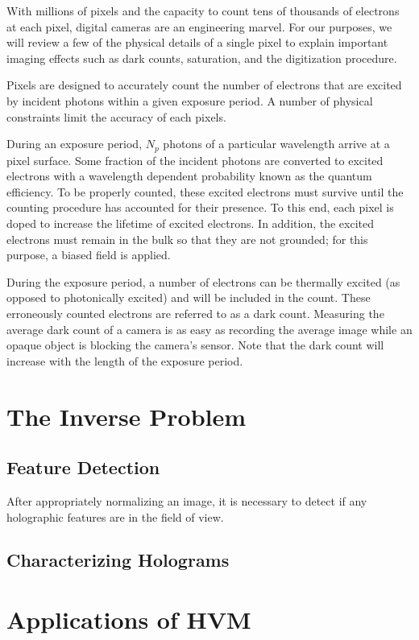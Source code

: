 With millions of pixels and the capacity to count tens of thousands of electrons at each pixel,
digital cameras are an engineering marvel. For our purposes, we will review a few of the physical
details of a single pixel to explain important imaging effects such as dark counts, saturation,
and the digitization procedure.

Pixels are designed to accurately count the number of electrons that are
excited by incident photons within a given exposure period. A number of physical constraints
limit the accuracy of each pixels.

During an exposure period, $N_p$ photons of a particular wavelength arrive at a pixel
surface. Some fraction of the incident photons are converted to excited electrons
with a wavelength dependent probability known as the quantum efficiency. To be properly
counted, these excited electrons must survive until the counting procedure has
accounted for their presence. To this end, each pixel is doped to increase the lifetime
of excited electrons. In addition, the excited electrons must remain in the bulk so that
they are not grounded; for this purpose, a biased field is applied. %

During the exposure period, a number of electrons can be thermally excited (as opposed to
photonically excited) and will be included in the count. These erroneously
counted electrons are referred to as a dark count. Measuring the average dark count of a
camera is as easy as recording the average image while an opaque object is blocking the
camera's sensor. Note that the dark count will increase with the length of the exposure
period.



\section{The Inverse Problem}

\subsection{Feature Detection}

After appropriately normalizing an image, it is necessary to detect if any holographic
features are in the field of view. 

\subsection{Characterizing Holograms}

\section{Applications of HVM}
